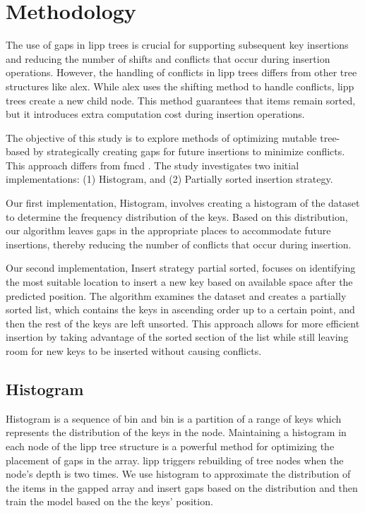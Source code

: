 
\chapter{Methodology} \label{implementation}
The use of gaps in \acrshort{lipp} trees is crucial for supporting subsequent key insertions and reducing the number of shifts and conflicts that occur during insertion operations. However, the handling of conflicts in \acrshort{lipp}  trees differs from other tree structures like \acrshort{alex}. While \acrshort{alex} uses the shifting method to handle conflicts, \acrshort{lipp}  trees create a new child node. This method guarantees that items remain sorted, but it introduces extra computation cost during insertion operations.

The objective of this study is to explore methods of optimizing mutable tree-based \learnindex by strategically creating gaps for future insertions to minimize conflicts. This approach differs from \acrshort{fmcd} \cite{LIPP}. The study investigates two initial implementations: (1) Histogram, and (2) Partially sorted insertion strategy.

Our first implementation, Histogram, involves creating a histogram of the dataset to determine the frequency distribution of the keys. Based on this distribution, our algorithm leaves gaps in the appropriate places to accommodate future insertions, thereby reducing the number of conflicts that occur during insertion.

Our second implementation, Insert strategy partial sorted, focuses on identifying the most suitable location to insert a new key based on available space after the predicted position. The algorithm examines the dataset and creates a partially sorted list, which contains the keys in ascending order up to a certain point, and then the rest of the keys are left unsorted. This approach allows for more efficient insertion by taking advantage of the sorted section of the list while still leaving room for new keys to be inserted without causing conflicts.

\section{Histogram}
Histogram is a sequence of bin and bin is a partition of a range of keys which represents the distribution of the keys in the node.
Maintaining a histogram in each node of the \acrshort{lipp} tree structure is a powerful method for optimizing the placement of gaps in the array. \acrshort{lipp} triggers rebuilding of tree nodes when the node's depth is two times. We use histogram to approximate the distribution of the items in the gapped array and insert gaps based on the distribution and then train the model based on the the keys' position. 

